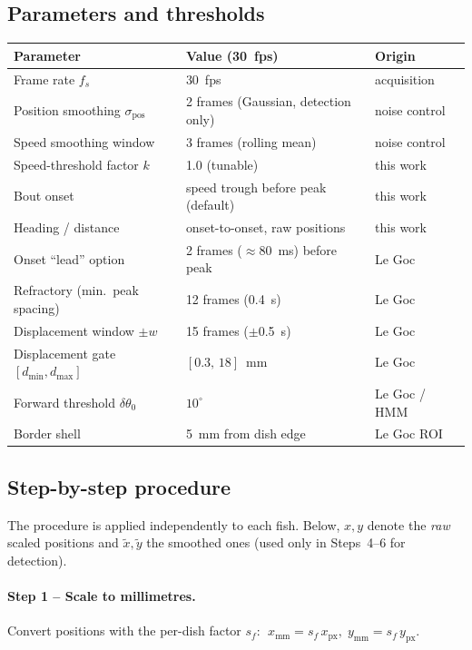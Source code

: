 \documentclass{article}
\begin{document}
\subsection{Parameters and thresholds}
\begin{table}[h]\centering\small
\begin{tabular}{@{}lll@{}}
\toprule
\textbf{Parameter} & \textbf{Value (30~fps)} & \textbf{Origin}\\
\midrule
Frame rate $f_s$                  & 30~fps                  & acquisition\\
Position smoothing $\sigma_{\text{pos}}$ & 2 frames (Gaussian, detection only) & noise control\\
Speed smoothing window            & 3 frames (rolling mean) & noise control\\
Speed-threshold factor $k$        & 1.0 (tunable)           & this work\\
Bout onset                        & speed trough before peak (default) & this work\\
Heading / distance                & onset-to-onset, raw positions & this work\\
Onset ``lead'' option             & 2 frames ($\approx$80~ms) before peak & Le Goc\\
Refractory (min.\ peak spacing)   & 12 frames (0.4~s)       & Le Goc\\
Displacement window $\pm w$       & 15 frames ($\pm$0.5~s)  & Le Goc\\
Displacement gate $[d_{\min},d_{\max}]$ & $[0.3,\,18]$~mm   & Le Goc\\
Forward threshold $\delta\theta_0$ & $10^\circ$             & Le Goc / HMM\\
Border shell                      & 5~mm from dish edge     & Le Goc ROI\\
\bottomrule
\end{tabular}
\end{table}

\subsection{Step-by-step procedure}
The procedure is applied independently to each fish. Below, $x,y$ denote the
\emph{raw} scaled positions and $\tilde x,\tilde y$ the smoothed ones (used only
in Steps~4--6 for detection).

\paragraph{Step 1 -- Scale to millimetres.}
Convert positions with the per-dish factor $s_f$:
$\;x_{\text{mm}} = s_f\, x_{\text{px}},\; y_{\text{mm}} = s_f\, y_{\text{px}}$.
\end{document}
